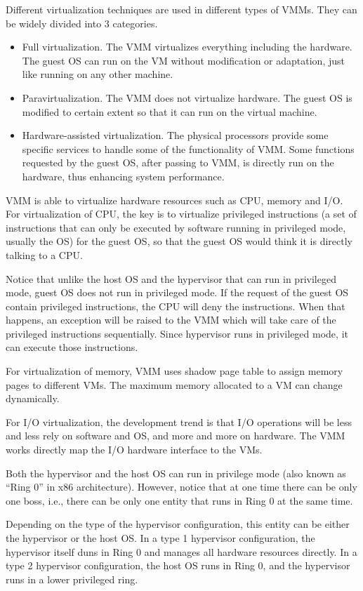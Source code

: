 Different virtualization techniques are used in different types of VMMs. They can be widely divided into 3 categories.
\begin{itemize}
	\item Full virtualization. The VMM virtualizes everything including the hardware. The guest OS can run on the VM without modification or adaptation, just like running on any other machine.
	\item Paravirtualization. The VMM does not virtualize hardware. The guest OS is modified to certain extent so that it can run on the virtual machine.
	\item Hardware-assisted virtualization. The physical processors provide some specific services to handle some of the functionality of VMM. Some functions requested by the guest OS, after passing to VMM, is directly run on the hardware, thus enhancing system performance.
\end{itemize}

VMM is able to virtualize hardware resources such as CPU, memory and I/O. For virtualization of CPU, the key is to virtualize privileged instructions (a set of instructions that can only be executed by software running in privileged mode, usually the OS) for the guest OS, so that the guest OS would think it is directly talking to a CPU.

Notice that unlike the host OS and the hypervisor that can run in privileged mode, guest OS does not run in privileged mode. If the request of the guest OS contain privileged instructions, the CPU will deny the instructions. When that happens, an exception will be raised to the VMM which will take care of the privileged instructions sequentially. Since hypervisor runs in privileged mode, it can execute those instructions.

For virtualization of memory, VMM uses shadow page table to assign memory pages to different VMs. The maximum memory allocated to a VM can change dynamically.

For I/O virtualization, the development trend is that I/O operations will be less and less rely on software and OS, and more and more on hardware. The VMM works directly map the I/O hardware interface to the VMs.

\begin{shortbox}
	Both the hypervisor and the host OS can run in privilege mode (also known as ``Ring 0'' in x86 architecture). However, notice that at one time there can be only one boss, i.e., there can be only one entity that runs in Ring 0 at the same time.
	
	Depending on the type of the hypervisor configuration, this entity can be either the hypervisor or the host OS. In a type 1 hypervisor configuration, the hypervisor itself duns in Ring 0 and manages all hardware resources directly. In a type 2 hypervisor configuration, the host OS runs in Ring 0, and the hypervisor runs in a lower privileged ring.
\end{shortbox}

